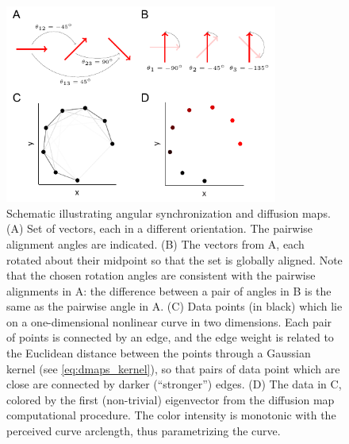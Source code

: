 \begin{figure}[t]
\centering
\includegraphics[width=0.8\textwidth]{fig2}
\caption[Schematic illustrating angular synchronization and diffusion maps]{Schematic illustrating angular synchronization and diffusion maps. (A) Set of vectors, each in a different orientation. The pairwise alignment angles are indicated. (B) The vectors from A, each rotated about their midpoint so that the set is globally aligned. Note that the chosen rotation angles are consistent with the pairwise alignments in A: the difference between a pair of angles in B is the same as the pairwise angle in A. (C) Data points (in black) which lie on a one-dimensional nonlinear curve in two dimensions. Each pair of points is connected by an edge, and the edge weight is related to the Euclidean distance between the points through a Gaussian kernel (see \eqref{eq:dmaps_kernel}), so that pairs of data point which are close are connected by darker (``stronger'') edges. (D) The data in C, colored by the first (non-trivial) eigenvector from the diffusion map computational procedure. The color intensity is monotonic with the perceived curve arclength, thus parametrizing the curve.}
\label{fig:schematics}
\end{figure}

